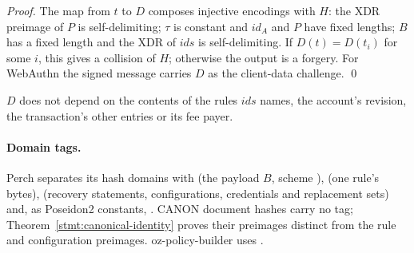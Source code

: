 \begin{proof}
The map from $t$ to $D$ composes injective encodings with $H$: the XDR preimage
of $P$ is self-delimiting; $\tau$ is constant and $\mathit{id}_A$ and $P$ have
fixed lengths; $B$ has a fixed length and the XDR of $\mathit{ids}$ is
self-delimiting. If $D(t) = D(t_i)$ for some $i$, this gives a collision of $H$;
otherwise the output is a forgery. For WebAuthn the signed message carries $D$ as
the client-data challenge. \qed
\end{proof}

\noindent $D$ does not depend on the contents of the rules $\mathit{ids}$ names,
the account's revision, the transaction's other entries or its fee payer.


\paragraph{Domain tags.} Perch separates its hash domains with
 (the payload $B$, scheme
),  (one rule's bytes),
 (recovery statements, configurations, credentials and
replacement sets) and, as Poseidon2 constants, . CANON
document hashes carry no tag; Theorem~\ref{stmt:canonical-identity} proves their
preimages distinct from the rule and configuration preimages. oz-policy-builder
uses .
